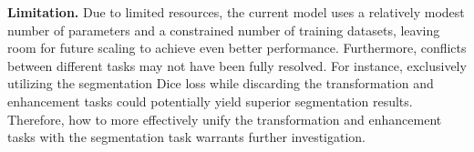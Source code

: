 \noindent\textbf{Limitation.}  Due to limited resources, the current model uses a relatively modest number of parameters and a constrained number of training datasets, leaving room for future scaling to achieve even better performance. Furthermore, conflicts between different tasks may not have been fully resolved. For instance, exclusively utilizing the segmentation Dice loss while discarding the transformation and enhancement tasks could potentially yield superior segmentation results. Therefore, how to more effectively unify the transformation and enhancement tasks with the segmentation task warrants further investigation.







